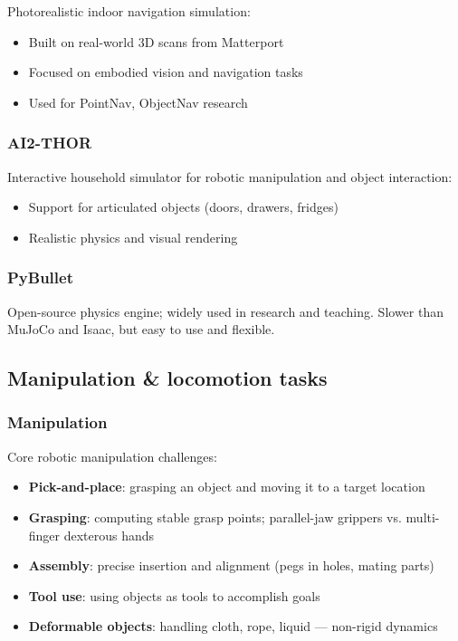 Photorealistic indoor navigation simulation:
\begin{itemize}
\item Built on real-world 3D scans from Matterport
\item Focused on embodied vision and navigation tasks
\item Used for PointNav, ObjectNav research
\end{itemize}

\subsubsection{AI2-THOR}

Interactive household simulator for robotic manipulation and object interaction:
\begin{itemize}
\item Support for articulated objects (doors, drawers, fridges)
\item Realistic physics and visual rendering
\end{itemize}

\subsubsection{PyBullet}

Open-source physics engine; widely used in research and teaching. Slower than MuJoCo and Isaac, but easy to use and flexible.

\subsection{Manipulation \& locomotion tasks}

\subsubsection{Manipulation}

Core robotic manipulation challenges:
\begin{itemize}
\item \textbf{Pick-and-place}: grasping an object and moving it to a target location
\item \textbf{Grasping}: computing stable grasp points; parallel-jaw grippers vs. multi-finger dexterous hands
\item \textbf{Assembly}: precise insertion and alignment (pegs in holes, mating parts)
\item \textbf{Tool use}: using objects as tools to accomplish goals
\item \textbf{Deformable objects}: handling cloth, rope, liquid — non-rigid dynamics
\end{itemize}

